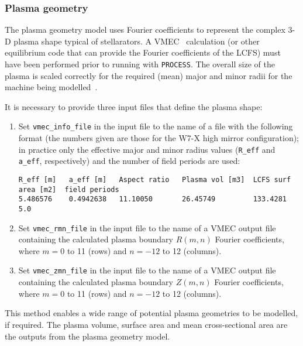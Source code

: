 \documentclass[11pt,a4paper]{report}
\newcommand{\process}{\mbox{\texttt{PROCESS}}}
\begin{document}
\subsubsection{Plasma geometry}

The plasma geometry model uses Fourier coefficients to represent the complex
3-D plasma shape typical of stellarators. A VMEC~\cite{vmec} calculation (or
other equilibrium code that can provide the Fourier coefficients of the LCFS)
must have been performed prior to running with \process. The overall size of
the plasma is scaled correctly for the required (mean) major and minor radii
for the machine being modelled~\cite{geiger}.

It is necessary to provide three input files that define the plasma shape:

\begin{enumerate}

\item Set \texttt{vmec\_info\_file} in the input file to the name of a file
  with the following format (the numbers given are those for the W7-X high
  mirror configuration); in practice only the effective major and minor radius
  values (\texttt{R\_eff} and \texttt{a\_eff}, respectively) and the number of
  field periods are used:

\footnotesize
\begin{verbatim}
R_eff [m]   a_eff [m]   Aspect ratio   Plasma vol [m3]  LCFS surf area [m2]  field periods
5.486576    0.4942638   11.10050       26.45749         133.4281             5.0
\end{verbatim}
\normalsize

\item Set \texttt{vmec\_rmn\_file} in the input file to the name of a VMEC
  output file containing the calculated plasma boundary $R(m,n)$ Fourier
  coefficients, where $m = 0$ to 11 (rows) and $n = -12$ to 12 (columns).

\item Set \texttt{vmec\_zmn\_file} in the input file to the name of a VMEC
  output file containing the calculated plasma boundary $Z(m,n)$ Fourier
  coefficients, where $m = 0$ to 11 (rows) and $n = -12$ to 12 (columns).

\end{enumerate}

This method enables a wide range of potential plasma geometries to be
modelled, if required. The plasma volume, surface area and mean
cross-sectional area are the outputs from the plasma geometry model.
\end{document}
